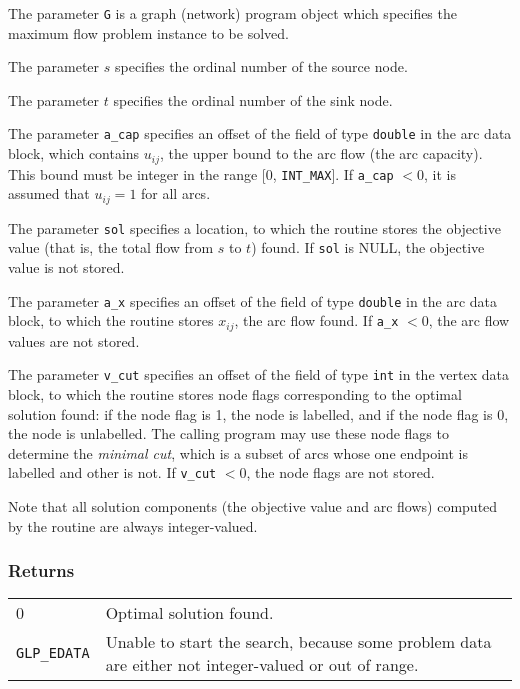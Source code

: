The parameter \verb|G| is a graph (network) program object which
specifies the maximum flow problem instance to be solved.

The parameter $s$ specifies the ordinal number of the source node.

The parameter $t$ specifies the ordinal number of the sink node.

The parameter \verb|a_cap| specifies an offset of the field of type
\verb|double| in the arc data block, which contains $u_{ij}$, the upper
bound to the arc flow (the arc capacity). This bound must be integer in
the range [0, \verb|INT_MAX|]. If \verb|a_cap| $<0$, it is assumed that
$u_{ij}=1$ for all arcs.

The parameter \verb|sol| specifies a location, to which the routine
stores the objective value (that is, the total flow from $s$ to $t$)
found. If \verb|sol| is NULL, the objective value is not stored.

The parameter \verb|a_x| specifies an offset of the field of type
\verb|double| in the arc data block, to which the routine stores
$x_{ij}$, the arc flow found. If \verb|a_x| $<0$, the arc flow values
are not stored.

The parameter \verb|v_cut| specifies an offset of the field of type
\verb|int| in the vertex data block, to which the routine stores node
flags corresponding to the optimal solution found: if the node flag is
1, the node is labelled, and if the node flag is 0, the node is
unlabelled. The calling program may use these node flags to determine
the {\it minimal cut}, which is a subset of arcs whose one endpoint is
labelled and other is not. If \verb|v_cut| $<0$, the node flags are not
stored.

Note that all solution components (the objective value and arc flows)
computed by the routine are always integer-valued.

\subsubsection*{Returns}

\def\arraystretch{1}

\begin{tabular}{@{}p{25mm}p{97.3mm}@{}}
0 & Optimal solution found.\\
\verb|GLP_EDATA| & Unable to start the search, because some problem
data are either not integer-valued or out of range.\\
\end{tabular}

